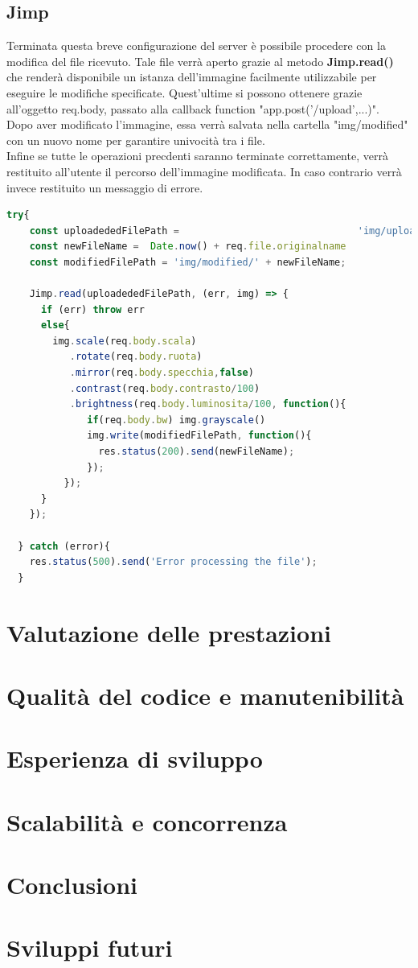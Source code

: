 \subsection{Jimp}
Terminata questa breve configurazione del server è possibile procedere con la modifica del file ricevuto. Tale file verrà aperto grazie al metodo \textbf{Jimp.read()} che renderà disponibile un istanza dell'immagine facilmente utilizzabile per eseguire le modifiche specificate. 
Quest'ultime si possono ottenere grazie all'oggetto req.body, passato alla callback function "app.post('/upload',...)".
\\Dopo aver modificato l'immagine, essa verrà salvata nella cartella "img/modified" con un nuovo nome per garantire univocità tra i file.
\\Infine se tutte le operazioni precdenti saranno terminate correttamente, verrà restituito all'utente il percorso dell'immagine modificata. In caso contrario verrà invece restituito un messaggio di errore.
\begin{lstlisting}[language=Javascript,caption={Elaborazione immagine grazie ai metodi di Jimp}, showstringspaces=false]
    try{
    const uploadededFilePath =                               'img/uploaded/' + req.file.originalname
    const newFileName =  Date.now() + req.file.originalname 
    const modifiedFilePath = 'img/modified/' + newFileName;

    Jimp.read(uploadededFilePath, (err, img) => {
      if (err) throw err
      else{
        img.scale(req.body.scala)
           .rotate(req.body.ruota)
           .mirror(req.body.specchia,false)
           .contrast(req.body.contrasto/100)
           .brightness(req.body.luminosita/100, function(){
              if(req.body.bw) img.grayscale()
              img.write(modifiedFilePath, function(){
                res.status(200).send(newFileName);
              });
          });
      }
    });

  } catch (error){
    res.status(500).send('Error processing the file');
  }
\end{lstlisting}

\section{Valutazione delle prestazioni}
\section{Qualità del codice e manutenibilità}
\section{Esperienza di sviluppo}
\section{Scalabilità e concorrenza}
\section{Conclusioni}
\section{Sviluppi futuri}



\begin{lstlisting}[language=Javascript, showstringspaces=false]
\end{lstlisting}